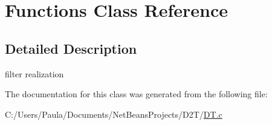 \hypertarget{class_functions}{}\section{Functions Class Reference}
\label{class_functions}


\subsection{Detailed Description}
filter realization 

The documentation for this class was generated from the following file\+:\begin{DoxyCompactItemize}
\item 
C\+:/\+Users/\+Paula/\+Documents/\+Net\+Beans\+Projects/\+D2\+T/\mbox{\hyperlink{_d_t_8c}{D\+T.\+c}}\end{DoxyCompactItemize}
